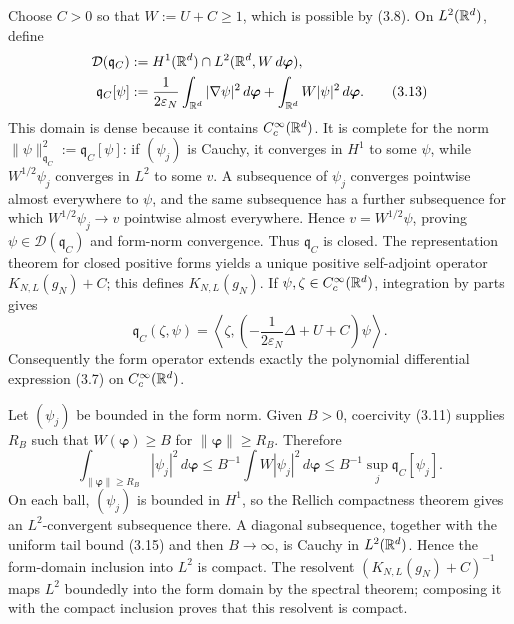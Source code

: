 \documentclass[11pt,a4paper]{article}
\newcommand{\eps}{\varepsilon}
\newcommand{\dd}{\,d}
\begin{document}
Choose \(C>0\) so that \(W:=U+C\ge1\), which is possible by (3.8).
On \(L^2(\mathbb R^d)\), define
\begin{align}
 \mathcal D(\mathfrak q_C)
 &:=H^1(\R^d)\cap L^2(\R^d,W\dd\bm\varphi),\\
 \mathfrak q_C[\psi]
 &:=\frac1{2\eps_N}\int_{\R^d}|\nabla\psi|^2\dd\bm\varphi
   +\int_{\R^d}W|\psi|^2\dd\bm\varphi.                       \tag{3.13}
\end{align}
This domain is dense because it contains \(C_c^\infty(\mathbb R^d)\).  It is complete
for the norm
\(\|\psi\|_{\mathfrak q_C}^2:=\mathfrak q_C[\psi]\): if
\((\psi_j)\) is Cauchy, it converges in \(H^1\) to some \(\psi\), while
\(W^{1/2}\psi_j\) converges in \(L^2\) to some \(v\).  A subsequence of
\(\psi_j\) converges pointwise almost everywhere to \(\psi\), and the same
subsequence has a further subsequence for which \(W^{1/2}\psi_j\to v\)
pointwise almost everywhere.  Hence \(v=W^{1/2}\psi\), proving
\(\psi\in\mathcal D(\mathfrak q_C)\) and form-norm convergence.  Thus
\(\mathfrak q_C\) is closed.  The representation theorem for closed positive
forms yields a unique positive self-adjoint operator \(K_{N,L}(g_N)+C\);
this defines \(K_{N,L}(g_N)\).  If
\(\psi,\zeta\in C_c^\infty(\mathbb R^d)\), integration by parts gives
\[
 \mathfrak q_C(\zeta,\psi)
 =\left\langle\zeta,
 \left(-\frac1{2\eps_N}\Delta+U+C\right)\psi\right\rangle.      \tag{3.14}
\]
Consequently the form operator extends exactly the polynomial differential
expression (3.7) on \(C_c^\infty(\mathbb R^d)\).


Let \((\psi_j)\) be bounded in the form norm.  Given \(B>0\), coercivity
(3.11) supplies \(R_B\) such that \(W(\bm\varphi)\ge B\) for
\(\|\bm\varphi\|\ge R_B\).  Therefore
\[
 \int_{\|\bm\varphi\|\ge R_B}|\psi_j|^2\dd\bm\varphi
 \le B^{-1}\int W|\psi_j|^2\dd\bm\varphi
 \le B^{-1}\sup_j\mathfrak q_C[\psi_j].                       \tag{3.15}
\]
On each ball, \((\psi_j)\) is bounded in \(H^1\), so the Rellich compactness
theorem gives an \(L^2\)-convergent subsequence there.  A diagonal subsequence,
together with the uniform tail bound (3.15) and then \(B\to\infty\), is Cauchy
in \(L^2(\mathbb R^d)\).  Hence the form-domain inclusion into \(L^2\) is compact.
The resolvent \((K_{N,L}(g_N)+C)^{-1}\) maps \(L^2\) boundedly into the form
domain by the spectral theorem; composing it with the compact inclusion proves
that this resolvent is compact.

\end{document}
